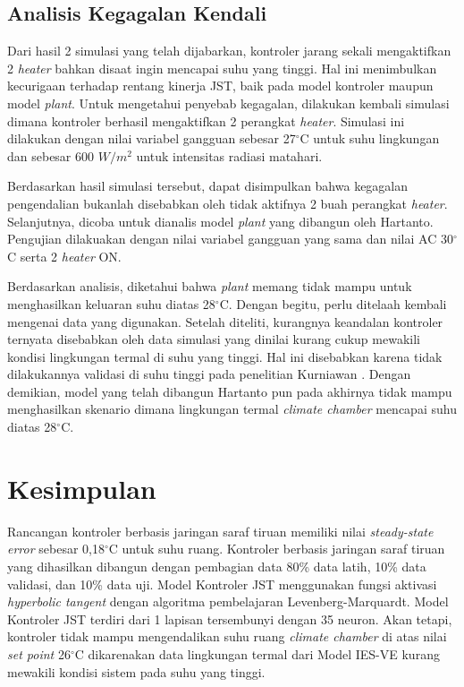 \documentclass[a4paper,10pt]{article}
\newenvironment{body}{\begin{multicols}{2}}{\end{multicols}}
\begin{document}
\begin{body}
		\subsection{Analisis Kegagalan Kendali}
		
		Dari hasil 2 simulasi yang telah dijabarkan, kontroler jarang sekali mengaktifkan 2 \textit{heater} bahkan disaat ingin mencapai suhu yang tinggi. Hal ini menimbulkan kecurigaan terhadap rentang kinerja JST, baik pada model kontroler maupun model \textit{plant}. Untuk mengetahui penyebab kegagalan, dilakukan kembali simulasi dimana kontroler berhasil mengaktifkan 2 perangkat \textit{heater}. Simulasi ini dilakukan dengan nilai variabel gangguan sebesar 27$^\circ$C untuk suhu lingkungan dan sebesar 600 $W/m^2$ untuk intensitas radiasi matahari.
		
		Berdasarkan hasil simulasi tersebut, dapat disimpulkan bahwa kegagalan pengendalian bukanlah disebabkan oleh tidak aktifnya 2 buah perangkat \textit{heater}. Selanjutnya, dicoba untuk dianalis model \textit{plant} yang dibangun oleh Hartanto. Pengujian dilakuakan dengan nilai variabel gangguan yang sama dan nilai AC 30$^\circ$C serta 2 \textit{heater} ON.
		
		Berdasarkan analisis, diketahui bahwa \textit{plant} memang tidak mampu untuk menghasilkan keluaran suhu diatas 28$^\circ$C. Dengan begitu, perlu ditelaah kembali mengenai data yang digunakan. Setelah diteliti, kurangnya keandalan kontroler ternyata disebabkan oleh data simulasi yang dinilai kurang cukup mewakili kondisi lingkungan termal di suhu yang tinggi. Hal ini disebabkan karena tidak dilakukannya validasi di suhu tinggi pada penelitian Kurniawan \cite{skripsiIchfan}. Dengan demikian, model yang telah dibangun Hartanto pun pada akhirnya tidak mampu menghasilkan skenario dimana lingkungan termal \textit{climate chamber} mencapai suhu diatas 28$^\circ$C.\\
		
		\section{Kesimpulan}
		Rancangan kontroler berbasis jaringan saraf tiruan memiliki nilai \textit{steady-state error} sebesar 0,18$^\circ$C untuk suhu ruang. Kontroler berbasis jaringan saraf tiruan yang dihasilkan dibangun dengan pembagian data 80\% data latih, 10\% data validasi, dan 10\% data uji. Model Kontroler JST menggunakan fungsi aktivasi \textit{hyperbolic tangent} dengan algoritma pembelajaran Levenberg-Marquardt. Model Kontroler JST terdiri dari 1 lapisan tersembunyi dengan 35 neuron. Akan tetapi, kontroler tidak mampu mengendalikan suhu ruang \textit{climate chamber} di atas nilai \textit{set point} 26$^\circ$C dikarenakan data lingkungan termal dari Model IES-VE kurang mewakili kondisi sistem pada suhu yang tinggi.\\
		

\end{body}
\end{document}
